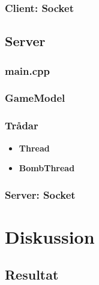 \documentclass[10pt, titlepage, oneside, a4paper]{article}
\begin{document}
    		\subsubsection{Client: Socket}
    		
    	\subsection{Server}
    		\subsubsection{main.cpp}
    		\subsubsection{GameModel}
    		\subsubsection{Trådar}
    		\begin{itemize}
    			\item\textbf{Thread}
    			\item\textbf{BombThread}
    		\end{itemize}
    		\subsubsection{Server: Socket}
    		
   
   	

    \newpage
    \section{Diskussion}
    	\subsection{Resultat}
    	
\end{document}
